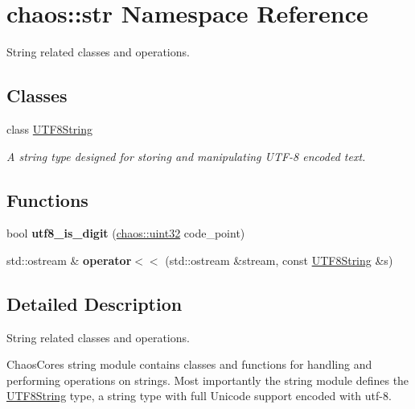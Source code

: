 \hypertarget{namespacechaos_1_1str}{}\section{chaos\+:\+:str Namespace Reference}
\label{namespacechaos_1_1str}


String related classes and operations.  


\subsection*{Classes}
\begin{DoxyCompactItemize}
\item 
class \hyperlink{classchaos_1_1str_1_1_u_t_f8_string}{U\+T\+F8\+String}
\begin{DoxyCompactList}\small\item\em A string type designed for storing and manipulating U\+T\+F-\/8 encoded text. \end{DoxyCompactList}\end{DoxyCompactItemize}
\subsection*{Functions}
\begin{DoxyCompactItemize}
\item 
\hypertarget{namespacechaos_1_1str_adc9b55515e06b320356d219cb573b20e}{}bool {\bfseries utf8\+\_\+is\+\_\+digit} (\hyperlink{namespacechaos_a3b3a47ba1e284655bf1a30c441121c60}{chaos\+::uint32} code\+\_\+point)\label{namespacechaos_1_1str_adc9b55515e06b320356d219cb573b20e}

\item 
\hypertarget{namespacechaos_1_1str_a52c2e2a749a31eb5c59062c76ebc35ff}{}std\+::ostream \& {\bfseries operator$<$$<$} (std\+::ostream \&stream, const \hyperlink{classchaos_1_1str_1_1_u_t_f8_string}{U\+T\+F8\+String} \&s)\label{namespacechaos_1_1str_a52c2e2a749a31eb5c59062c76ebc35ff}

\end{DoxyCompactItemize}


\subsection{Detailed Description}
String related classes and operations. 

Chaos\+Core\textquotesingle{}s string module contains classes and functions for handling and performing operations on strings. Most importantly the string module defines the \hyperlink{classchaos_1_1str_1_1_u_t_f8_string}{U\+T\+F8\+String} type, a string type with full Unicode support encoded with utf-\/8. 